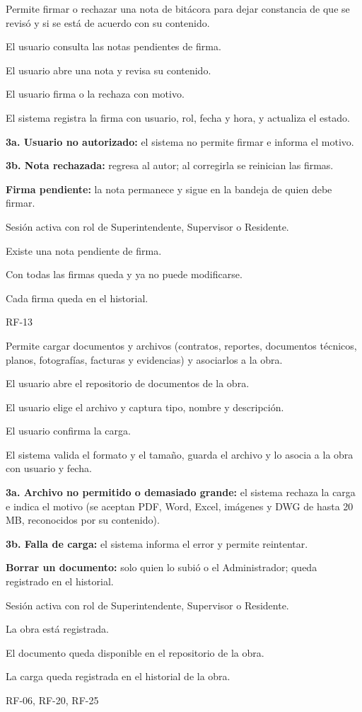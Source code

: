 {Permite firmar o rechazar una nota de bitácora para dejar constancia de que se revisó y si se está de acuerdo con su contenido.}
{\item El usuario consulta las notas pendientes de firma.
 \item El usuario abre una nota y revisa su contenido.
 \item El usuario firma o la rechaza con motivo.
 \item El sistema registra la firma con usuario, rol, fecha y hora, y actualiza el estado.}
{\item \textbf{3a. Usuario no autorizado:} el sistema no permite firmar e informa el motivo.
 \item \textbf{3b. Nota rechazada:} regresa al autor; al corregirla se reinician las firmas.
 \item \textbf{Firma pendiente:} la nota permanece  y sigue en la bandeja de quien debe firmar.}
{\item Sesión activa con rol de Superintendente, Supervisor o Residente.
 \item Existe una nota pendiente de firma.}
{\item Con todas las firmas queda  y ya no puede modificarse.
 \item Cada firma queda en el historial.}
{RF-13}

{Permite cargar documentos y archivos (contratos, reportes, documentos técnicos, planos, fotografías, facturas y evidencias) y asociarlos a la obra.}
{\item El usuario abre el repositorio de documentos de la obra.
 \item El usuario elige el archivo y captura tipo, nombre y descripción.
 \item El usuario confirma la carga.
 \item El sistema valida el formato y el tamaño, guarda el archivo y lo asocia a la obra con usuario y fecha.}
{\item \textbf{3a. Archivo no permitido o demasiado grande:} el sistema rechaza la carga e indica el motivo (se aceptan PDF, Word, Excel, imágenes y DWG de hasta 20\,MB, reconocidos por su contenido).
 \item \textbf{3b. Falla de carga:} el sistema informa el error y permite reintentar.
 \item \textbf{Borrar un documento:} solo quien lo subió o el Administrador; queda registrado en el historial.}
{\item Sesión activa con rol de Superintendente, Supervisor o Residente.
 \item La obra está registrada.}
{\item El documento queda disponible en el repositorio de la obra.
 \item La carga queda registrada en el historial de la obra.}
{RF-06, RF-20, RF-25}

